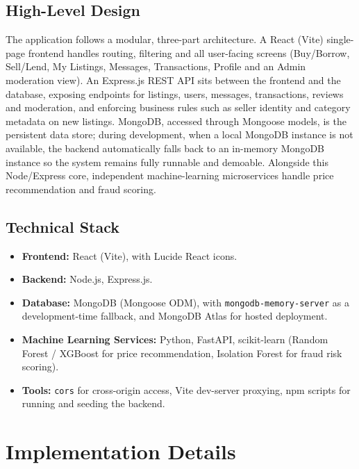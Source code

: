\documentclass[12pt]{report}
\begin{document}
\subsection{High-Level Design}
The application follows a modular, three-part architecture. A React (Vite) single-page
frontend handles routing, filtering and all user-facing screens (Buy/Borrow, Sell/Lend, My
Listings, Messages, Transactions, Profile and an Admin moderation view). An Express.js REST
API sits between the frontend and the database, exposing endpoints for listings, users,
messages, transactions, reviews and moderation, and enforcing business rules such as
seller identity and category metadata on new listings. MongoDB, accessed through Mongoose
models, is the persistent data store; during development, when a local MongoDB instance is
not available, the backend automatically falls back to an in-memory MongoDB instance so the
system remains fully runnable and demoable. Alongside this Node/Express core, independent
machine-learning microservices handle price recommendation and fraud scoring.

\subsection{Technical Stack}
\begin{itemize}
    \item \textbf{Frontend:} React (Vite), with Lucide React icons.
    \item \textbf{Backend:} Node.js, Express.js.
    \item \textbf{Database:} MongoDB (Mongoose ODM), with \texttt{mongodb-memory-server} as a
    development-time fallback, and MongoDB Atlas for hosted deployment.
    \item \textbf{Machine Learning Services:} Python, FastAPI, scikit-learn (Random
    Forest / XGBoost for price recommendation, Isolation Forest for fraud risk scoring).
    \item \textbf{Tools:} \texttt{cors} for cross-origin access, Vite dev-server proxying,
    npm scripts for running and seeding the backend.
\end{itemize}

\section{Implementation Details}
\end{document}

